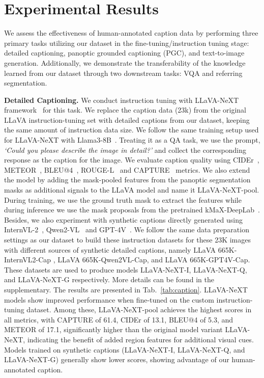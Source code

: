 















\section{Experimental Results}
We assess the effectiveness of human-annotated caption data by performing three primary tasks utilizing our dataset in the fine-tuning/instruction tuning stage: detailed captioning, panoptic grounded captioning (PGC), and text-to-image generation. Additionally, we demonstrate the transferability of the knowledge learned from our dataset through two downstream tasks: VQA and referring segmentation.

\noindent\textbf{Detailed Captioning.} We conduct instruction tuning with LLaVA-NeXT framework~\cite{liu2024llavanext} for this task. We replace the caption data (23k) from the original LLaVA instruction-tuning set with detailed captions from our dataset, keeping the same amount of instruction data size. We follow the same training setup used for LLaVA-NeXT with Llama3-8B~\cite{dubey2024llama3}. Treating it as a QA task, we use the prompt, \textit{`Could you please describe the image in detail?'} and collect the corresponding response as the caption for the image. We evaluate caption quality using CIDEr~\cite{vedantam2015cider}, METEOR~\cite{banerjee2005meteor}, BLEU@4~\cite{papineni2002bleu}, ROUGE-L~\cite{lin2004rouge} and CAPTURE~\cite{dong2024capture} metrics. We also extend the model by adding the mask-pooled features from the panoptic segmentation masks as additional signals to the LLaVA model and name it LLaVA-NeXT-pool.  During training, we use the ground truth mask to extract the features while during inference we use the mask proposals from the pretrained kMaX-DeepLab~\cite{yu2022kmaxdeeplab}. Besides, we also experiment with synthetic captions directly generated using InternVL-2~\cite{chen2024internvl2}, Qwen2-VL~\cite{wang2024qwen2vl} and GPT-4V~\cite{achiam2023gpt4v}. We follow the same data preparation settings as our dataset to build these instruction datasets for these 23K images with different sources of synthetic detailed captions, namely LLaVA 665K-InternVL2-Cap , LLaVA 665K-Qwen2VL-Cap, and LLaVA 665K-GPT4V-Cap. These datasets are used to produce models LLaVA-NeXT-I, LLaVA-NeXT-Q, and LLaVA-NeXT-G respectively.
More details can be found in the supplementary. The results are presented in Tab.~\ref{tab:caption}. LLaVA-NeXT models show improved performance when fine-tuned on the custom instruction-tuning dataset. Among these, LLaVA-NeXT-pool achieves the highest scores in all metrics, with CAPTURE of 61.4, CIDEr of 13.1, BLEU@4 of 5.3, and METEOR of 17.1, significantly higher than the original model variant LLaVA-NeXT, indicating the benefit of added region features for additional visual cues.  Models trained on synthetic captions (LLaVA-NeXT-I, LLaVA-NeXT-Q, and LLaVA-NeXT-G) generally show lower scores, showing advantage of our human-annotated caption. 


